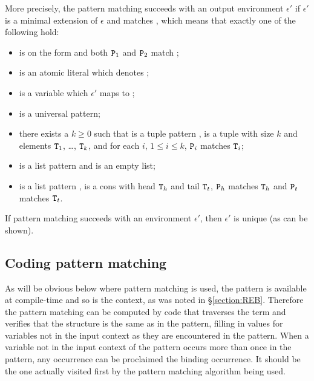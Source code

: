 More precisely, the pattern matching succeeds with an output environment $\epsilon'$
if $\epsilon'$ is a minimal extension of $\epsilon$ and  matches ,
which means that exactly one of the following hold:
\begin{itemize}
\item {} is on the form  and
both ${\tt{\sl P}}_1$ and ${\tt{\sl P}}_2$ match ;
\item {} is an atomic literal which denotes ;
\item {} is a variable which $\epsilon'$ maps to ;
\item {} is a universal pattern;
\item there exists a $k\geq0$ such that  is a tuple pattern ,
 is a tuple with size $k$ and elements ${\tt{\sl T}}_1$, \ldots, ${\tt{\sl T}}_k$, and for
each $i$, $1\leq i\leq k$, ${\tt{\sl P}}_i$ matches ${\tt{\sl T}}_i$;
\item {} is a list pattern \T{[]} and  is an empty list;
\item {} is a list pattern \T{[$\Z{P}_h$|$\Z{P}_t$]},  is a cons
with head ${\tt{\sl T}}_h$ and tail ${\tt{\sl T}}_t$, ${\tt{\sl P}}_h$ matches ${\tt{\sl T}}_h$ and
${\tt{\sl P}}_t$ matches ${\tt{\sl T}}_t$.
\end{itemize}

\noindent If pattern matching succeeds with an environment $\epsilon'$, then
$\epsilon'$ is unique (as can be shown).

\subsection{Coding pattern matching}

\label{section:coding-pattern-matching}

As will be obvious below where pattern matching is used, the pattern
is available at compile-time and so is the context, as was noted in
\S\ref{section:REB}.  Therefore the pattern matching can be computed
by code that traverses the term and verifies that the structure is the
same as in the pattern, filling in values for variables not in the
input context as they are encountered in the pattern.  When a variable
not in the input context of the pattern occurs more than once in the
pattern, any occurrence can be proclaimed the binding occurrence.  It
should be the one actually visited first by the pattern matching
algorithm being used.

